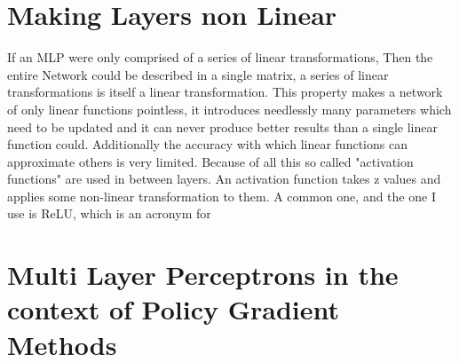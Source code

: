 \section*{Making Layers non Linear}\label{nn:activation}
If an MLP were only comprised of a series of linear transformations, Then the entire Network could be described in a single matrix, a series of linear transformations is itself a linear transformation. This property makes a network of only linear functions pointless, it introduces needlessly many parameters which need to be updated and it can never produce better results than a single linear function could. Additionally the accuracy with which linear functions can approximate others is very limited. Because of all this so called "activation functions" are used in between layers. An activation function takes z values and applies some non-linear transformation to them. A common one, and the one I use is ReLU, which is an acronym for 

\section{Multi Layer Perceptrons in the context of Policy Gradient Methods}\label{nn:example}
